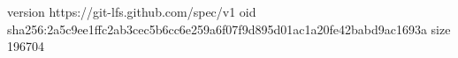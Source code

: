 version https://git-lfs.github.com/spec/v1
oid sha256:2a5c9ee1ffc2ab3cec5b6cc6e259a6f07f9d895d01ac1a20fe42babd9ac1693a
size 196704
